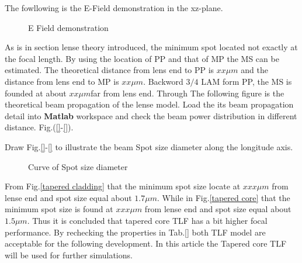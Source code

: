 The fowllowing is the E-Field demonstration in the xz-plane.
\begin{figure}
	\caption{E Field demonstration}
\end{figure}
As is in section lense theory introduced, the minimum spot located not exactly at the focal length. By using the location of PP and that of MP the MS can be estimated. The theoretical distance from lens end to PP is $xx \mu m$ and the distance from lens end to MP is  $xx \mu m$. Backword $3/4$ LAM form PP, the MS is founded at about $xx \mu m$far from lens end. Through The following figure is the theoretical beam propagation of the lense model.
Load the its beam propagation detail into \textbf{Matlab} workspace and check the beam power distribution in different distance. Fig.(\ref{}-\ref{}).%

\begin{figure}
\end{figure}
 
Draw Fig.\ref{}-\ref{} to illustrate the beam Spot size diameter along the longitude axis.

\begin{figure}
\caption{Curve of Spot size diameter}
\end{figure}
From Fig.\ref{tapered cladding} that the minimum spot size locate at $xxx \mu m$ from lense end and spot size equal about $1.7 \mu m$. While in Fig.\ref{tapered core} that the minimum spot size is found at  $xxx \mu m$ from lense end and spot size equal about $1.5 \mu m$. Thus it is concluded that tapered core TLF has a bit higher focal performance. By rechecking the properties in Tab.\ref{} both TLF model are acceptable for the following development. In this article the Tapered core TLF will be used for further simulations. 
